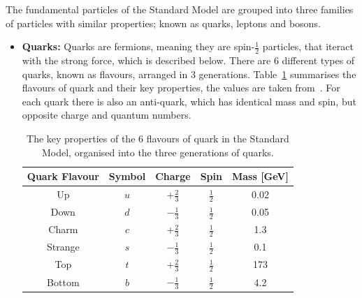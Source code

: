 The fundamental particles of the Standard Model
are grouped into three families of particles with similar properties;
known as quarks, leptons and bosons.

\begin{itemize}[leftmargin=*]
\item\textbf{Quarks:}
  Quarks are fermions, meaning they are spin-$\frac{1}{2}$ particles,
  that iteract with the strong force, which is described below.
  There are 6 different types of quarks, known as flavours, arranged in 3 generations.
  Table~\ref{tab:theo-sm_quarks} summarises the flavours of quark and their key properties,
  the values are taken from~\cite{obj-bjets_PDG}.
  For each quark there is also an anti-quark, which has identical mass and spin, but opposite charge and quantum numbers.
  {\renewcommand{\arraystretch}{1.5}
  \begin{table}[!ht]
  \begin{center}
    \begin{tabular}{|c||c|c|c|c|}
      \hline
    Quark Flavour & Symbol & Charge            &  Spin           &  Mass [GeV]\\
    \hline
    Up            &   $u$  &  $+\frac{2}{3}$   &  $\frac{1}{2}$  &  0.02\\
    Down          &   $d$  &  $-\frac{1}{3}$   &  $\frac{1}{2}$  &  0.05\\
    \hline                                                   
    Charm         &   $c$  &  $+\frac{2}{3}$   &  $\frac{1}{2}$  &  1.3 \\
    Strange       &   $s$  &  $-\frac{1}{3}$   &  $\frac{1}{2}$  &  0.1 \\
    \hline                                                      
    Top           &   $t$  &  $+\frac{2}{3}$   &  $\frac{1}{2}$  &  173  \\
    Bottom        &   $b$  &  $-\frac{1}{3}$   &  $\frac{1}{2}$  &  4.2  \\
    \hline  
  \end{tabular}
    \caption{The key properties of the 6 flavours of quark in the Standard Model,
    organised into the three generations of quarks.}
  \label{tab:theo-sm_quarks}
  \end{center}
  \end{table}}


\end{itemize}
